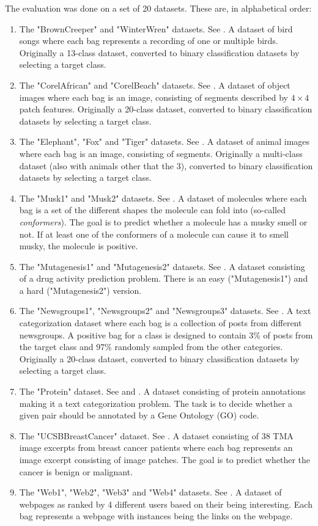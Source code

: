 The evaluation was done on a set of 20 datasets. These are, in alphabetical order:
\begin{enumerate}
  \item The "BrownCreeper" and "WinterWren" datasets. See \cite{briggs_rank-loss_2012}. A dataset of bird songs where each bag represents a recording of one or multiple birds. Originally a 13-class dataset, converted to binary classification datasets by selecting a target class.
  \item The "CorelAfrican" and "CorelBeach" datasets. See \cite{chen_miles:_2006}. A dataset of object images where each bag is an image, consisting of segments described by \( 4 \times 4 \) patch features. Originally a 20-class dataset, converted to binary classification datasets by selecting a target class.
  \item The "Elephant", "Fox" and "Tiger" datasets. See \cite{andrews_support_2002}. A dataset of animal images where each bag is an image, consisting of segments. Originally a multi-class dataset (also with animals other that the 3), converted to binary classification datasets by selecting a target class.
  \item The "Musk1" and "Musk2" datasets. See \cite{dietterich_solving_1997}. A dataset of molecules where each bag is a set of the different shapes the molecule can fold into (so-called \textit{conformers}). The goal is to predict whether a molecule has a musky smell or not. If at least one of the conformers of a molecule can cause it to smell musky, the molecule is positive.
  \item The "Mutagenesis1" and "Mutagenesis2" datasets. See \cite{srinivasan_comparing_1995}. A dataset consisting of a drug activity prediction problem. There is an easy ("Mutagenesis1") and a hard ("Mutagenesis2") version.
  \item The "Newsgroups1", "Newsgroups2" and "Newsgroups3" datasets. See \cite{zhou_multi-instance_2008}. A text categorization dataset where each bag is a collection of posts from different newsgroups. A positive bag for a class is designed to contain 3\% of posts from the target class and 97\% randomly sampled from the other categories. Originally a 20-class dataset, converted to binary classification datasets by selecting a target class.
  \item The "Protein" dataset. See \cite{ray_learning_2005} and \cite{ray_supervised_2005}. A dataset consisting of protein annotations making it a text categorization problem. The task is to decide whether a given pair should be annotated by a Gene Ontology (GO) code.
  \item The "UCSBBreastCancer" dataset. See \cite{kandemir_empowering_2014}. A dataset consisting of 38 TMA image excerpts from breast cancer patients where each bag represents an image excerpt consisting of image patches. The goal is to predict whether the cancer is benign or malignant.
  \item The "Web1", "Web2", "Web3" and "Web4" datasets. See \cite{zhou_multi-instance_2005}. A dataset of webpages as ranked by 4 different users based on their being interesting. Each bag represents a webpage with instances being the links on the webpage.
\end{enumerate}

